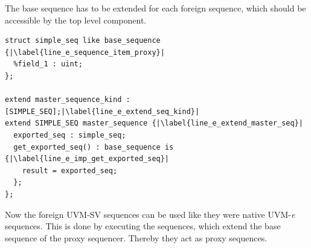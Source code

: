 The base sequence has to be extended for each foreign sequence, which should be accessible by the top level component.
\lstset{language=e, numbers = left, escapechar=|, breaklines=true}
\begin{lstlisting}[frame=htrbl, caption={\textit{e}: exporting the foreign UVM-SV sequence},
label={lst:e_exporting_sequence}]
struct simple_seq like base_sequence {|\label{line_e_sequence_item_proxy}|
  %field_1 : uint;
};

extend master_sequence_kind : [SIMPLE_SEQ];|\label{line_e_extend_seq_kind}|
extend SIMPLE_SEQ master_sequence {|\label{line_e_extend_master_seq}|
  exported_seq : simple_seq;
  get_exported_seq() : base_sequence is {|\label{line_e_imp_get_exported_seq}|
    result = exported_seq;
  };
};
\end{lstlisting}
Now the foreign UVM-SV sequences can be used like they were native UVM-\textit{e} sequences. This is done by executing the sequences, which extend the base sequence of the proxy sequencer. Thereby they act as proxy sequences.
